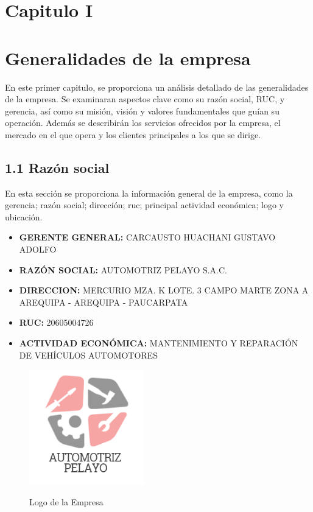 \newpage
\section{Capitulo I}
\section*{Generalidades de la empresa}
En este primer capitulo, se proporciona un análisis detallado de las generalidades de la empresa. Se examinaran aspectos clave como su razón social, RUC, y gerencia, así como su misión, visión y valores fundamentales que guían su operación. Además se describirán los servicios ofrecidos por la empresa, el mercado en el que opera y los clientes principales a los que se dirige.
\subsection{1.1 Razón social}
En esta sección se proporciona la información general de la empresa, como la gerencia; razón social; dirección; ruc; principal actividad económica; logo y ubicación.
\begin{itemize}
    \item[] \textbf{GERENTE GENERAL: }CARCAUSTO HUACHANI GUSTAVO ADOLFO
    \item[] \textbf{RAZÓN SOCIAL: } AUTOMOTRIZ PELAYO S.A.C.
    \item[] \textbf{DIRECCION: } MERCURIO MZA. K LOTE. 3 CAMPO MARTE ZONA A AREQUIPA - AREQUIPA - PAUCARPATA
    \item[] \textbf{RUC:} 20605004726    
    \item[] \textbf{ACTIVIDAD ECONÓMICA: }MANTENIMIENTO Y REPARACIÓN DE VEHÍCULOS AUTOMOTORES
\end{itemize}
\begin{figure}[h]
    \centering
        \captionsetup{singlelinecheck=false}
    \caption*{Logo de la Empresa}
    \includegraphics[width=5cm]{imagenes/logo.png}
    \label{fig:logo}
\end{figure}
\newpage

